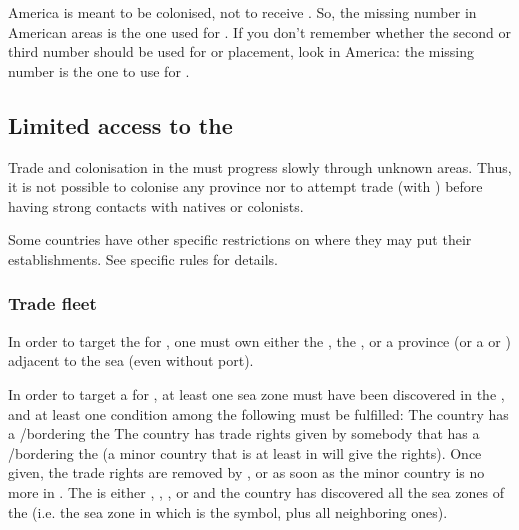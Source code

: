 \begin{playtip}
  America is meant to be colonised, not to receive \TP. So, the missing number
  in American areas is the one used for \TP. If you don't remember whether the
  second or third number should be used for \COL or \TP placement, look in
  America: the missing number is the one to use for \TP.
\end{playtip}



\subsection{Limited access to the \ROTW}\label{chAdministration:Limited Access ROTW}

\aparag Trade and colonisation in the \ROTW must progress slowly through
unknown areas. Thus, it is not possible to colonise any province nor to
attempt trade (with \TradeFLEET) before having strong contacts with natives or
colonists.

\aparag Some countries have other specific restrictions on where they may put
their establishments. See specific rules for details.


\subsubsection{Trade fleet}\label{chAdministration:Limited Access}
 In order to target the  for \TFI, one must
own either the , the , or a province (or
a \COL or \TP) adjacent to the sea (even without port).

\aparag[\ROTW \STZ] In order to target a \ROTW \STZ for \TFI, at least one sea
zone must have been discovered in the \STZ, and at least one condition among
the following must be fulfilled:
\bparag The country has a \COL/\TP bordering the \STZ
\bparag {} The country has
trade rights given by somebody that has a \COL/\TP bordering the \STZ (a minor
country that is at least in \MA will give the rights). Once given, the trade
rights are removed by , or as soon as the minor country
is no more in \MA.
\bparag The \STZ is either , , ,
 or  and the country has discovered all the sea zones
of the \STZ (i.e. the sea zone in which is the symbol, plus all neighboring
ones).

